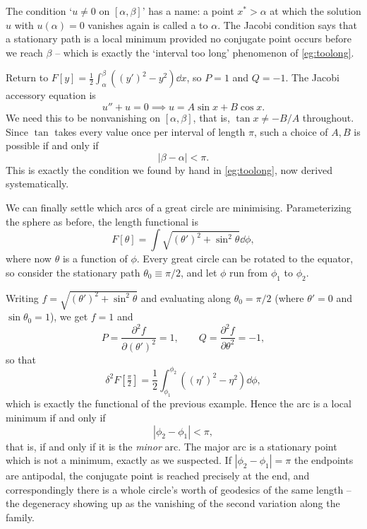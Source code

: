 The condition `$u \neq 0$ on $[\alpha,\beta]$' has a name: a point $x^* > \alpha$ at which the solution $u$ with $u(\alpha) = 0$ vanishes again is called a  to $\alpha$. The Jacobi condition says that a stationary path is a local minimum provided no conjugate point occurs before we reach $\beta$ -- which is exactly the `interval too long' phenomenon of \autoref{eg:toolong}.

\begin{example}
	Return to $F[y] = \frac{1}{2}\int_\alpha^\beta\left((y')^2 - y^2\right)\dd x$, so $P = 1$ and $Q = -1$. The Jacobi accessory equation is
	$$
	u'' + u = 0 \implies u = A\sin x + B\cos x.
	$$
	We need this to be nonvanishing on $[\alpha, \beta]$, that is, $\tan x \neq -B/A$ throughout. Since $\tan$ takes every value once per interval of length $\pi$, such a choice of $A, B$ is possible if and only if
	$$
	|\beta - \alpha| < \pi.
	$$
	This is exactly the condition we found by hand in \autoref{eg:toolong}, now derived systematically.
\end{example}

\begin{example}
	We can finally settle which arcs of a great circle are minimising. Parameterizing the sphere as before, the length functional is
	$$
	F[\theta] = \int \sqrt{(\theta')^2 + \sin^2\theta}\dd\phi,
	$$
	where now $\theta$ is a function of $\phi$. Every great circle can be rotated to the equator, so consider the stationary path $\theta_0 \equiv \pi/2$, and let $\phi$ run from $\phi_1$ to $\phi_2$.

	Writing $f = \sqrt{(\theta')^2 + \sin^2\theta}$ and evaluating along $\theta_0 = \pi/2$ (where $\theta' = 0$ and $\sin\theta_0 = 1$), we get $f = 1$ and
	$$
	P = \frac{\partial^2 f}{\partial(\theta')^2} = 1, \qquad Q = \frac{\partial^2 f}{\partial\theta^2} = -1,
	$$
	so that
	$$
	\delta^2 F\left[\tfrac{\pi}{2}\right] = \frac{1}{2}\int_{\phi_1}^{\phi_2}\left((\eta')^2 - \eta^2\right)\dd\phi,
	$$
	which is exactly the functional of the previous example. Hence the arc is a local minimum if and only if
	$$
	|\phi_2 - \phi_1| < \pi,
	$$
	that is, if and only if it is the \emph{minor} arc. The major arc is a stationary point which is not a minimum, exactly as we suspected. If $|\phi_2 - \phi_1| = \pi$ the endpoints are antipodal, the conjugate point is reached precisely at the end, and correspondingly there is a whole circle's worth of geodesics of the same length -- the degeneracy showing up as the vanishing of the second variation along the family.
\end{example}

